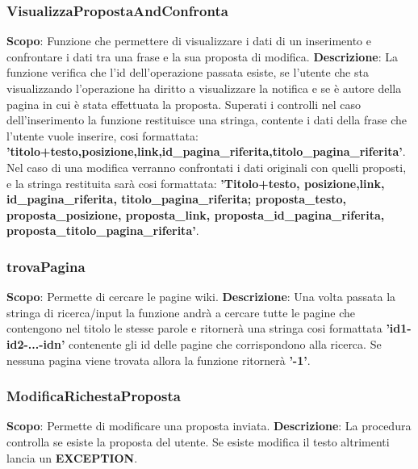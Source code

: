 \newpage
\subsubsection{VisualizzaPropostaAndConfronta}
\textbf{Scopo}: Funzione che permettere di visualizzare i dati di un inserimento e confrontare i dati tra una frase e la sua proposta di modifica.\newline\newline
\textbf{Descrizione}: La funzione verifica che l'id dell'operazione passata esiste, se l'utente che sta visualizzando l'operazione ha diritto a visualizzare la notifica e se è autore della pagina in cui è stata effettuata la proposta. Superati i controlli nel caso dell'inserimento la funzione restituisce una stringa, contente i dati della frase che l'utente vuole inserire, cosi formattata:  \textbf{'titolo+testo,posizione,link,id\_pagina\_riferita,titolo\_pagina\_riferita'}. Nel caso di una modifica verranno confrontati i dati originali con quelli proposti, e la stringa restituita sarà cosi formattata: \textbf{'Titolo+testo, posizione,link, id\_pagina\_riferita, titolo\_pagina\_riferita; proposta\_testo, proposta\_posizione, proposta\_link, proposta\_id\_pagina\_riferita, proposta\_titolo\_pagina\_riferita'}.\newline


\newpage
\subsubsection{trovaPagina}
\textbf{Scopo}: Permette di cercare le pagine wiki.\newline\newline
\textbf{Descrizione}: Una volta passata la stringa di ricerca/input la funzione andrà a cercare tutte le pagine che contengono nel titolo le stesse parole e ritornerà una stringa cosi formattata \textbf{'id1-id2-...-idn'} contenente gli id delle pagine che corrispondono alla ricerca. Se nessuna pagina viene trovata allora la funzione ritornerà \textbf{'-1'}.



\subsubsection{ModificaRichestaProposta}
\textbf{Scopo}: Permette di modificare una proposta inviata.\newline\newline
\textbf{Descrizione}: La procedura controlla se esiste la proposta del utente. Se esiste modifica il testo altrimenti lancia un \textbf{EXCEPTION}.
